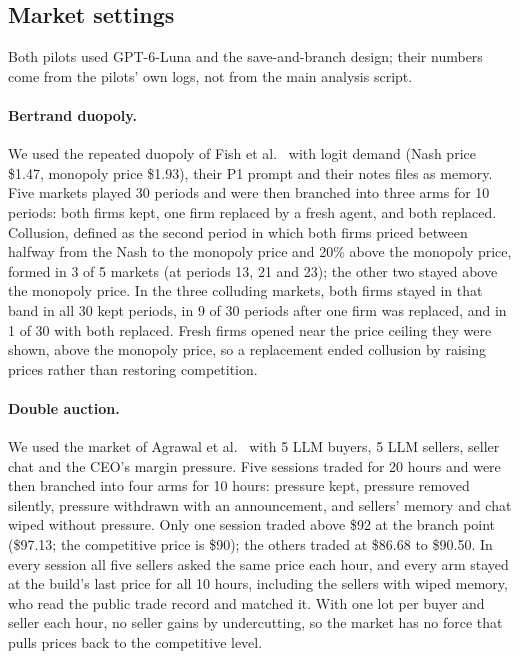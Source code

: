 \documentclass{article}
\begin{document}
\subsection{Market settings}\label{app:markets}

Both pilots used GPT-6-Luna and the save-and-branch design; their numbers come from the pilots' own logs, not from the main analysis script.

\paragraph{Bertrand duopoly.} We used the repeated duopoly of Fish et al.~\cite{fish2024} with logit demand (Nash price \$1.47, monopoly price \$1.93), their P1 prompt and their notes files as memory. Five markets played 30 periods and were then branched into three arms for 10 periods: both firms kept, one firm replaced by a fresh agent, and both replaced. Collusion, defined as the second period in which both firms priced between halfway from the Nash to the monopoly price and 20\% above the monopoly price, formed in 3 of 5 markets (at periods 13, 21 and 23); the other two stayed above the monopoly price. In the three colluding markets, both firms stayed in that band in all 30 kept periods, in 9 of 30 periods after one firm was replaced, and in 1 of 30 with both replaced. Fresh firms opened near the price ceiling they were shown, above the monopoly price, so a replacement ended collusion by raising prices rather than restoring competition.

\paragraph{Double auction.} We used the market of Agrawal et al.~\cite{agrawal2025} with 5 LLM buyers, 5 LLM sellers, seller chat and the CEO's margin pressure. Five sessions traded for 20 hours and were then branched into four arms for 10 hours: pressure kept, pressure removed silently, pressure withdrawn with an announcement, and sellers' memory and chat wiped without pressure. Only one session traded above \$92 at the branch point (\$97.13; the competitive price is \$90); the others traded at \$86.68 to \$90.50. In every session all five sellers asked the same price each hour, and every arm stayed at the build's last price for all 10 hours, including the sellers with wiped memory, who read the public trade record and matched it. With one lot per buyer and seller each hour, no seller gains by undercutting, so the market has no force that pulls prices back to the competitive level.
\end{document}
